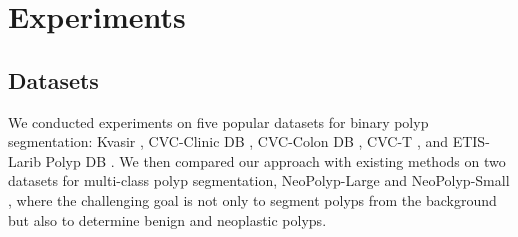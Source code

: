 \documentclass{article}
\begin{document}
\section{Experiments}
\label{sec:experiment}

\subsection{Datasets}
We conducted experiments on five popular datasets for binary polyp segmentation: Kvasir \cite{kvasir}, CVC-Clinic DB \cite{cvc_clinic}, CVC-Colon DB \cite{cvc_colon}, CVC-T \cite{endo}, and ETIS-Larib Polyp DB \cite{etis_larib}. We then compared our approach with existing methods on two datasets for multi-class polyp segmentation,  NeoPolyp-Large and NeoPolyp-Small \cite{ngoc2021neounet}, where the challenging goal is not only to segment polyps from the background but also to determine benign and neoplastic polyps. 
\end{document}
